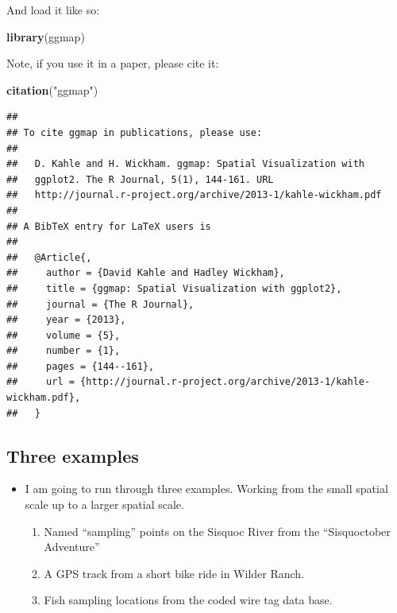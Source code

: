 \documentclass[]{book}
\newenvironment{Shaded}{\begin{snugshade}}{\end{snugshade}}
\newcommand{\KeywordTok}[1]{\textcolor[rgb]{0.13,0.29,0.53}{\textbf{{#1}}}}
\newcommand{\StringTok}[1]{\textcolor[rgb]{0.31,0.60,0.02}{{#1}}}
\newcommand{\NormalTok}[1]{{#1}}
\providecommand{\tightlist}{%
  \setlength{\itemsep}{0pt}\setlength{\parskip}{0pt}}
\theoremstyle{definition}
\theoremstyle{definition}
\theoremstyle{remark}
\begin{document}
And load it like so:

\begin{Shaded}
\begin{Highlighting}[]
\KeywordTok{library}\NormalTok{(ggmap)}
\end{Highlighting}
\end{Shaded}

Note, if you use it in a paper, please cite it:

\begin{Shaded}
\begin{Highlighting}[]
\KeywordTok{citation}\NormalTok{(}\StringTok{"ggmap"}\NormalTok{)}
\end{Highlighting}
\end{Shaded}

\begin{verbatim}
## 
## To cite ggmap in publications, please use:
## 
##   D. Kahle and H. Wickham. ggmap: Spatial Visualization with
##   ggplot2. The R Journal, 5(1), 144-161. URL
##   http://journal.r-project.org/archive/2013-1/kahle-wickham.pdf
## 
## A BibTeX entry for LaTeX users is
## 
##   @Article{,
##     author = {David Kahle and Hadley Wickham},
##     title = {ggmap: Spatial Visualization with ggplot2},
##     journal = {The R Journal},
##     year = {2013},
##     volume = {5},
##     number = {1},
##     pages = {144--161},
##     url = {http://journal.r-project.org/archive/2013-1/kahle-wickham.pdf},
##   }
\end{verbatim}

\subsection{Three examples}\label{three-examples}

\begin{itemize}
\tightlist
\item
  I am going to run through three examples. Working from the small
  spatial scale up to a larger spatial scale.

  \begin{enumerate}
  \def\labelenumi{\arabic{enumi}.}
  \tightlist
  \item
    Named ``sampling'' points on the Sisquoc River from the
    ``Sisquoctober Adventure''
  \item
    A GPS track from a short bike ride in Wilder Ranch.
  \item
    Fish sampling locations from the coded wire tag data base.
  \end{enumerate}
\end{itemize}
\end{document}
